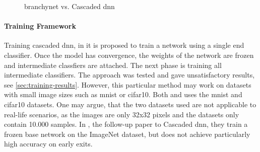 \begin{figure}
	\hspace{2em}
	\caption[\gls{branchynet} vs. Cascaded \gls{dnn}]{\gls{branchynet} vs. Cascaded \gls{dnn}}
\end{figure}


\paragraph{Training Framework} Training cascaded \gls{dnn}, in \cite{leroux_resource-constrained_2015} it is proposed to train a network using a single end classifier. Once the model has convergence, the weights of the network are frozen and intermediate classfiers are attached. The next phase is training all intermediate classifiers. The approach was tested and gave unsatisfactory results, see \ref{sec:training-results}. However, this particular method may work on datasets with small image sizes such as \gls{mnist} or \gls{cifar10}. Both \cite{leroux_resource-constrained_2015} and \cite{teerapittayanon_branchynet:_2016} uses the \gls{mnist} and \gls{cifar10} datasets. One may argue, that the two datasets used are not applicable to real-life scenarios, as the images are only 32x32 pixels and the datasets only contain 10.000 samples. In \cite{leroux_cascading_2017}, the follow-up paper to Cascaded \gls{dnn}, they train a frozen base network on the ImageNet dataset, but does not achieve particularly high accuracy on early exits.  

